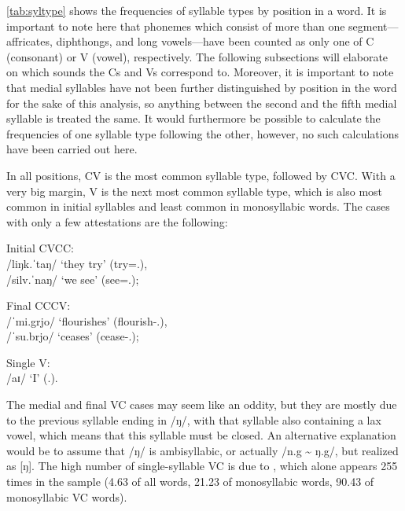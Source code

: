 \autoref{tab:syltype} shows the frequencies of syllable 
types by position in a word. It is important to note here 
that phonemes which consist of more than one segment---affricates, diphthongs, 
and long vowels---have been counted as only one of C (consonant) or V (vowel), 
respectively. The following subsections will elaborate on which sounds the Cs 
and Vs correspond to. Moreover, it is important to note that medial syllables 
have not been further distinguished by position in the word for the sake of 
this analysis, so anything between the second and the fifth medial syllable is 
treated the same. It would furthermore be possible to calculate the frequencies 
of one syllable type following the other, however, no such calculations have 
been carried out here.

In all positions, CV is the most common syllable type, followed by CVC. With a 
very big margin, V is the next most common syllable type, which is also most 
common in initial syllables and least common in monosyllabic words. The cases 
with only a few attestations are the following:

\pex
	\a Initial CVCC:\\
		 /liŋk.ˈtaŋ/ `they try' 
			(try=\TplM{}.\Aarg{}),\footnotemark \\
		 /silv.ˈnaŋ/ `we see' 
			(see=\Fpl{}.\Aarg{});
		
	\a Final CCCV:\\
		 /ˈmi.grjo/ `flourishes' 
			(flourish-\Tsg{}.\N{}),\\
		 /ˈsu.brjo/ `ceases' 
			(cease-\Tsg{}.\N{});
	
	\a Single V:\\
		 /aɪ/ `I' (\Fsg{}.\Top{}).
\xe


%
The medial and final VC cases may seem like an oddity, but they are mostly due 
to the previous syllable ending in /ŋ/, with that syllable also containing a 
lax vowel, which means that this syllable must be closed. An alternative 
explanation would be to assume that /ŋ/ is ambisyllabic, or actually /n.g 
\textasciitilde{} ŋ.g/, but realized as [ŋ].\label{ŋ} The high number of 
single-syllable VC is due to , which alone appears 255 
times in the sample (4.63\pct{} of all words, 21.23\pct{} of monosyllabic 
words, 90.43\pct{} of monosyllabic VC words).


